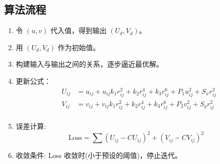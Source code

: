 \documentclass{lzureport}
\begin{document}
\subsection{算法流程}
\begin{enumerate}[label=\arabic*)]
	\item 令 $(u, v)$ 代入值，得到输出 $(U_d, V_d)$。
	\item 用 $(U_d, V_d)$ 作为初始值。
	\item 构建输入与输出之间的关系，逐步逼近最优解。
	\item 更新公式：
	$$
	\begin{aligned}
		&U_{ij}& =u_{ij}+u_{ij}k_1r_{ij}^2+k_2r_{ij}^4+k_3r_{ij}^6+P_1u_{ij}^2+S_xr_{ij}^2  \\
		&V_{ij}& =v_{ij}+v_{ij}k_1r_{ij}^2+k_2r_{ij}^4+k_3r_{ij}^6+P_2v_{ij}^2+S_yr_{ij}^2  \\
	\end{aligned}
	$$
	\item 误差计算:
	$$\mathrm{Loss}=\sum(U_{ij}-CU_{ij})^2+(V_{ij}-CV_{ij})^2$$

	\item 收敛条件:
	Loss 收敛时(小于预设的阈值)，停止迭代。
\end{enumerate}
\end{document}
